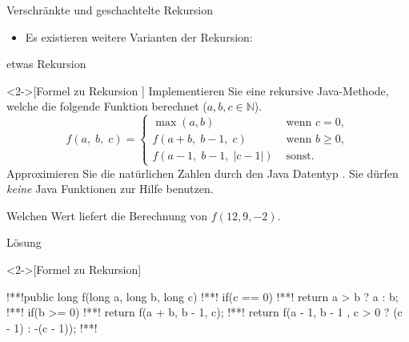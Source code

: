 \begin{frame}{Verschränkte und geschachtelte Rekursion}
    \begin{itemize}[<+(1)->]
        \widei
        \item Es existieren weitere Varianten der Rekursion: 
    \end{itemize}
\end{frame}

\ifull
\begingroup
\def\f(#1,#2,#3){f(#1,\;#2,\;#3)}%
\begin{frame}[c]{etwas Rekursion}
    \begin{exercise}<2->[Formel zu Rekursion ]
        Implementieren Sie eine rekursive Java-Methode, welche die folgende Funktion berechnet (\(a, b, c \in \mathbb{N}\)).
\begin{equation*}
    \f(a, b, c) = \begin{cases}
        \max(a,b) & \text{ wenn } c = 0, \\
        \f(a + b, b - 1, c) & \text{ wenn } b \geq 0, \\
        \f(a - 1, b - 1, |c - 1|) & \text{ sonst.}
    \end{cases}
\end{equation*}
    Approximieren Sie die natürlichen Zahlen durch den Java Datentyp . Sie dürfen \emph{keine} Java Funktionen zur Hilfe benutzen.\par
    Welchen Wert liefert die Berechnung von \(f(12, 9, -2)\).
    \end{exercise}
\end{frame}

\begin{frame}[c,fragile]{Lösung}
    \begin{solve}<2->[Formel zu Rekursion]
\begin{plainjava}
!**!public long f(long a, long b, long c) {
!**!    if(c == 0)
!**!        return a > b ? a : b;
!**!    if(b >= 0)
!**!        return f(a + b, b - 1, c);
!**!    return f(a - 1, b - 1 , c > 0 ? (c - 1) : -(c - 1));
!**!}
\end{plainjava}
    \onslide<7->{Weiter gilt \(\f(12, 3, -2) = 14\).}
    \end{solve}
\end{frame}

